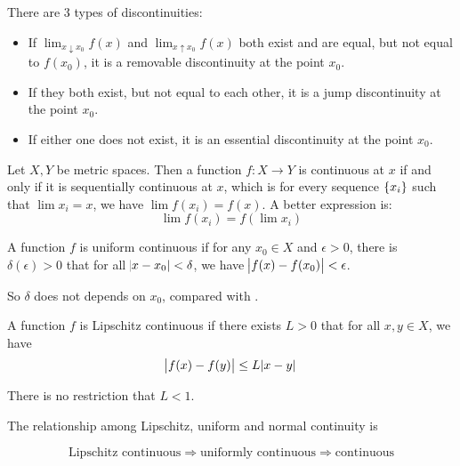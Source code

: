 \begin{definition}
    There are 3 types of discontinuities:
    \begin{itemize}
        \item If $\lim_{x \downarrow x_0} f(x)$ and $\lim_{x \uparrow x_0} f(x)$ both exist and are equal, but not equal to $f(x_0)$, it is a removable discontinuity at the point $x_0$.
        \item If they both exist, but not equal to each other, it is a jump discontinuity at the point $x_0$.
        \item If either one does not exist, it is an essential discontinuity at the point $x_0$.
    \end{itemize}
\end{definition}


\begin{theorem}
    Let $X,Y$ be metric spaces. Then a function $f: X\rightarrow Y$ is continuous at $x$ if and only if it is sequentially continuous at $x$, which is for every sequence $\set{x_i}$ such that $\lim x_i = x$, we have $\lim f(x_i) = f(x)$. A better expression is:
    \begin{equation}
        \lim f(x_i) = f(\lim x_i )
    \end{equation}
\end{theorem}



\begin{definition}
    A function $f$ is uniform continuous if for any $x_0 \in X$ and $\epsilon > 0$, there is $\delta(\epsilon) > 0$ that for all $\abs{x - x_0} < \delta$, we have $\abs{f(x) - f(x_0)} < \epsilon$.
    
    So $\delta$ does not depends on $x_0$, compared with .
\end{definition}

\begin{definition}
    A function $f$ is Lipschitz continuous if there exists $L > 0$ that for all $x,y \in X$, we have 
    \begin{equation}
        \abs{f(x) - f(y)} \leq L \abs{x - y}
    \end{equation}
    
    There is no restriction that $L < 1$.
\end{definition}

\begin{theorem}
    The relationship among Lipschitz, uniform and normal continuity is
    
    \begin{equation}
        \text{Lipschitz continuous} \Rightarrow \text{uniformly continuous} \Rightarrow \text{continuous}
    \end{equation}    
\end{theorem}


